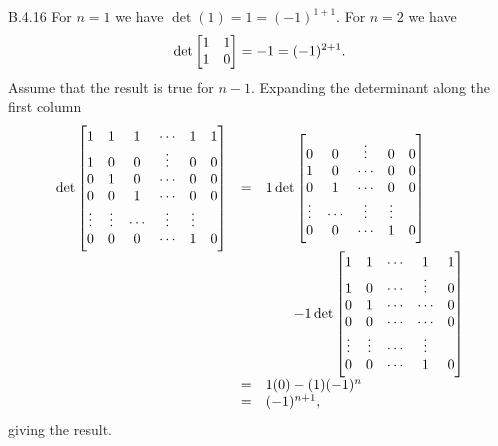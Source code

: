 \begin{Answer}{B.4.16}
 For $n = 1$ we
have $\det (1) = 1 = (-1)^{1 + 1}$. For $n = 2$ we have
$$\det \begin{bmatrix} 1 & 1 \cr 1 & 0 \cr
\end{bmatrix} = -1 = (-1)^{2 + 1}.
$$Assume that the result is true for $n -1$. Expanding the
determinant along the first column
$$ \begin{array}{lll}\det\begin{bmatrix} 1 & 1 & 1 & \cdots & 1 &
1 \cr  1& 0 & 0 & \vdots & 0  & 0 \cr  0 & 1 & 0 & \cdots & 0  & 0
\cr 0 & 0 & 1& \cdots & 0  & 0 \cr \vdots & \vdots & \cdots &
\vdots & \vdots \cr 0 & 0 & 0 & \cdots & 1 & 0 \cr
\end{bmatrix} &  = & 1\det\begin{bmatrix}  0 & 0 & \vdots & 0  & 0 \cr   1 & 0 & \cdots & 0  & 0
\cr  0 & 1& \cdots & 0  & 0 \cr  \vdots & \cdots & \vdots & \vdots
\cr  0 & 0 & \cdots & 1 & 0 \cr
\end{bmatrix} \\ & & \qquad - 1 \det\begin{bmatrix}  1 & 1 & \cdots & 1 &
1 \cr  1& 0 & \cdots & \vdots & 0   \cr  0 & 1 & \cdots & \cdots &
0 \cr 0 & 0 & \cdots & \cdots & 0   \cr \vdots & \vdots & \cdots &
\vdots \cr 0 & 0 & \cdots & 1 & 0 \cr
\end{bmatrix}\\
& = & 1(0) - (1)(-1)^{n}\\
& = &  (-1)^{n + 1},\\ \end{array}$$giving the result.
\end{Answer}
